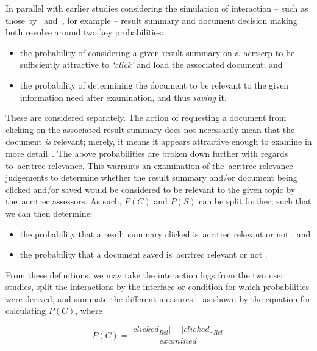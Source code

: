 In parallel with earlier studies considering the simulation of interaction -- such as those by~\cite{yilmaz2010browsing_utility} and~\cite{baskaya2013behavioural_factors}, for example -- result summary and document decision making both revolve around two key probabilities:

\begin{itemize}
    \item{the probability  of considering a given result summary on a~\gls{acr:serp} to be sufficiently attractive to \emph{`click'} and load the associated document; and}
    \item{the probability  of determining the document to be relevant to the given information need after examination, and thus \emph{saving} it.}
\end{itemize}

These are considered separately. The action of requesting a document from clicking on the associated result summary does not necessarily mean that the document \emph{is} relevant; merely, it means it appears attractive enough to examine in more detail~\citep{turpin2009summaries}. The above probabilities are broken down further with regards to~\gls{acr:trec} relevance. This warrants an examination of the~\gls{acr:trec} relevance judgements to determine whether the result summary and/or document being clicked and/or saved would be considered to be relevant to the given topic by the~\gls{acr:trec} assessors. As such, $P(C)$ and $P(S)$ can be split further, such that we can then determine:

\begin{itemize}
    \item{the probability that a result summary clicked is~\gls{acr:trec} relevant  or not ; and}
    \item{the probability that a document saved is~\gls{acr:trec} relevant  or not .}
\end{itemize}

From these definitions, we may take the interaction logs from the two user studies, split the interactions by the interface or condition for which probabilities were derived, and summate the different measures -- as shown by the equation for calculating $P(C)$, where

\begin{equation}
    P(C) = \frac{|clicked_{Rel}| + |clicked_{\neg Rel}|}{|examined|}
\end{equation}

